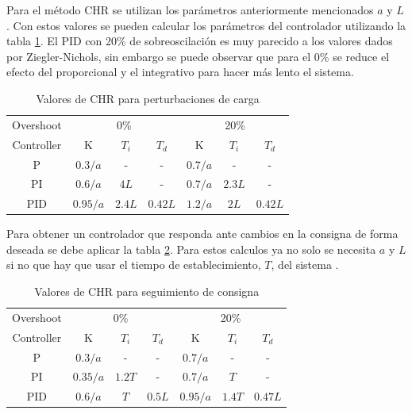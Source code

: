 \documentclass{book}
\begin{document}
Para el m\'etodo CHR se utilizan los par\'ametros anteriormente mencionados $a$ y $L$. Con estos valores se pueden calcular los par\'ametros del controlador utilizando la tabla \ref{ta:CHRload}. El PID con 20\% de sobreoscilaci\'on es muy parecido a los valores dados por Ziegler-Nichols, sin embargo se puede observar que para el 0\% se reduce el efecto del proporcional y el integrativo para hacer m\'as lento el sistema. \par

\begin{table}[h!]
\centering
\caption{Valores de CHR para perturbaciones de carga \cite{PIDbook}}
\label{ta:CHRload}
\begin{tabular}{@{}c|cccccc@{}}
Overshoot  & \multicolumn{3}{c}{0\%}      & \multicolumn{3}{c}{20\%}    \\
Controller & K        & $T_{i}$ & $T_{d}$ & K       & $T_{i}$ & $T_{d}$ \\ \hline
P          & $0.3/a$  & -       & -       & $0.7/a$ & -       & -       \\
PI         & $0.6/a$  & $4L$    & -       & $0.7/a$ & $2.3L$  & -       \\
PID        & $0.95/a$ & $2.4L$  & $0.42L$ & $1.2/a$ & $2L$    & $0.42L$ \\ 
\end{tabular}
\end{table} 

Para obtener un controlador que responda ante cambios en la consigna de forma deseada se debe aplicar la tabla \ref{ta:CHRsp}. Para estos calculos ya no solo se necesita $a$ y $L$ si no que hay que usar el tiempo de establecimiento, $T$, del sistema \cite{PIDbook}. \par

\begin{table}[]
\centering

\caption{Valores de CHR para seguimiento de consigna \cite{PIDbook}}
\label{ta:CHRsp}
\begin{tabular}{@{}c|cccccc@{}}
Overshoot  & \multicolumn{3}{c}{0\%}      & \multicolumn{3}{c}{20\%}     \\
Controller & K        & $T_{i}$ & $T_{d}$ & K        & $T_{i}$ & $T_{d}$ \\ \hline
P          & $0.3/a$  & -       & -       & $0.7/a$  & -       & -       \\
PI         & $0.35/a$ & $1.2T$  & -       & $0.7/a$  & $T$     & -       \\
PID        & $0.6/a$  & $T$     & $0.5L$  & $0.95/a$ & $1.4T$  & $0.47L$ \\ 
\end{tabular}
\end{table}
\end{document}
